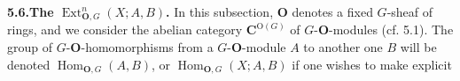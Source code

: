 \textbf{5.6.\quad The $\operatorname{Ext}^n_{{\mathbf O},G}(X;A,B)$.}
In this subsection, ${\mathbf O}$ denotes a fixed $G$-sheaf of rings, and we consider
the abelian category ${\mathbf C}^{\mathrm O(G)}$ of $G$-${\mathbf O}$-modules (cf. 5.1).
The group of $G$-${\mathbf O}$-homomorphisms from a $G$-${\mathbf O}$-module $A$ to another one
$B$ will be denoted $\operatorname{Hom}_{{\mathbf O},G}(A,B)$, or
$\operatorname{Hom}_{{\mathbf O},G}(X;A,B)$ if one wishes to make explicit

